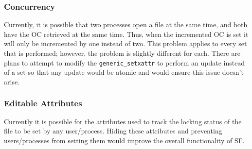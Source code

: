 \subsubsection*{Concurrency}

Currently, it is possible that two processes open a file at the same time, and both have the OC retrieved at the same time. Thus, when the incremented OC is set it will only be incremented by one instead of two. This problem applies to every set that is performed; however, the problem is slightly different for each. There are plans to attempt to modify the \texttt{generic\_setxattr} to perform an update instead of a set so that any update would be atomic and would ensure this issue doesn't arise.

\subsubsection*{Editable Attributes}

Currently it is possible for the attributes used to track the locking status of the file to be set by any user/process. Hiding these attributes and preventing users/processes from setting them would improve the overall functionality of SF.